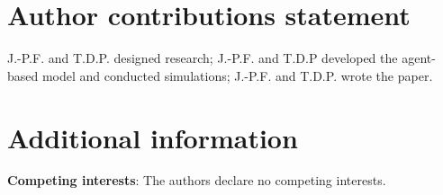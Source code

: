 \documentclass[fleqn,10pt]{wlscirep}
\begin{document}
\section*{Author contributions statement}
J.-P.F. and T.D.P. designed research; J.-P.F. and T.D.P developed the agent-based model and conducted simulations; J.-P.F. and T.D.P. wrote the paper.

\section*{Additional information}

\textbf{Competing interests}: The authors declare no competing interests. 

\end{document}
